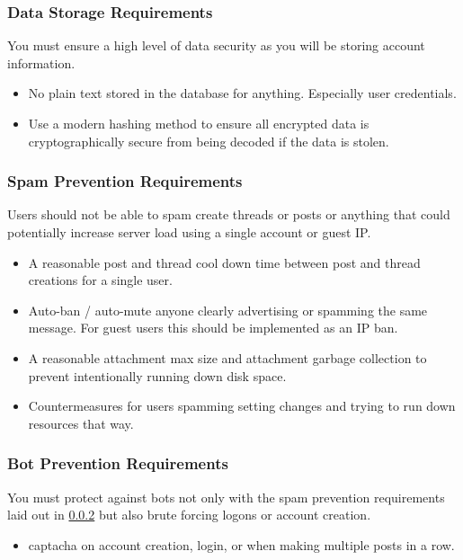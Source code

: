 \documentclass[]{article}
\begin{document}
\subsubsection{Data Storage Requirements}\label{dsr}
You must ensure a high level of data security as you will be storing account information.
\begin{itemize}
    \item No plain text stored in the database for anything. Especially user credentials. 
    \item Use a modern hashing method to ensure all encrypted data is cryptographically secure from being decoded if the data is stolen. 
\end{itemize}

\subsubsection{Spam Prevention Requirements} \label{spamprev}
Users should not be able to spam create threads or posts or anything that could potentially increase server load using a single account or guest IP.
\begin{itemize}
    \item A reasonable post and thread cool down time between post and thread creations for a single user.
    \item Auto-ban / auto-mute anyone clearly advertising or spamming the same message. For guest users this should be implemented as an IP ban.
    \item A reasonable attachment max size and attachment garbage collection to prevent intentionally running down disk space.
    \item Countermeasures for users spamming setting changes and trying to run down resources that way. 
\end{itemize}

\subsubsection{Bot Prevention Requirements}
You must protect against bots not only with the spam prevention requirements laid out in \ref{spamprev} but also brute forcing logons or account creation.
\begin{itemize}
    \item captacha on account creation, login, or when making multiple posts in a row. 
\end{itemize}
\end{document}
